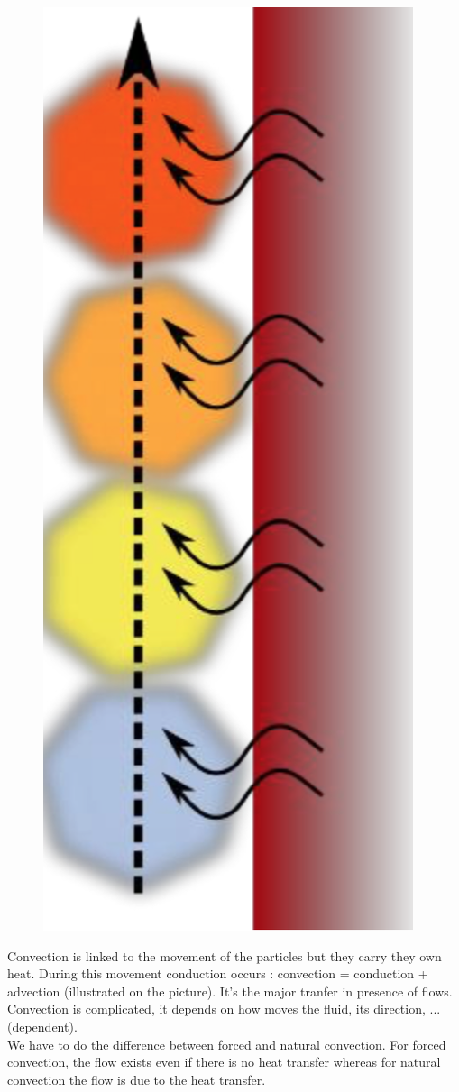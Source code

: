  		\begin{figure}
 		\vspace{-5mm}
 		\includegraphics[scale=0.15]{ch3/2}
 		\end{figure}
		Convection is linked to the movement of the particles but they carry they own heat. During this movement conduction occurs : convection = conduction + advection (illustrated on the picture). It's the major tranfer in presence of flows. Convection is complicated, it depends on how moves the fluid, its direction, ... (dependent). \\
		We have to do the difference between forced and natural convection. For forced convection, the flow exists even if there is no heat transfer whereas for natural convection the flow is due to the heat transfer. 
		
